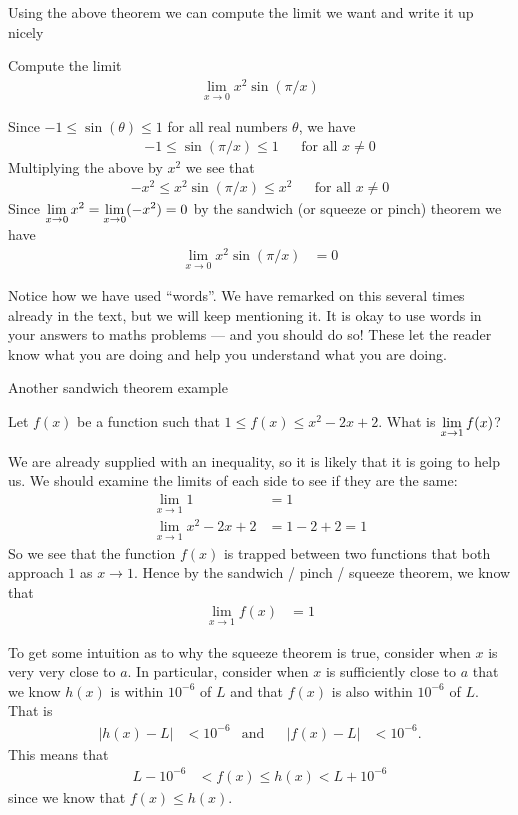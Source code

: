 Using the above theorem we can compute the limit we want and write it up nicely
\begin{eg}
  Compute the limit
\begin{align*}
  \lim_{x \to 0} x^2 \sin(\pi/x)
\end{align*}

  Since $-1 \leq \sin(\theta) \leq 1$ for all real numbers $\theta$, we have
\begin{align*}
  -1 \leq \sin(\pi /x ) \leq 1 && \text{for all $x \neq 0$}
\end{align*}
  Multiplying the above by $x^2$ we see that
\begin{align*}
  -x^2 \leq x^2 \sin(\pi /x ) \leq x^2 && \text{for all $x \neq 0$}
\end{align*}
  Since $\displaystyle \lim_{x \to 0} x^2 = \lim_{x \to 0} (-x^2) = 0$ by the sandwich
(or squeeze or pinch) theorem we have
\begin{align*}
  \lim_{x \to 0} x^2 \sin(\pi/x) &= 0
\end{align*}
\end{eg}
Notice how we have used ``words''. We have remarked on this several times
already in the text, but we will keep mentioning it. It is okay to use words in
your answers to maths problems --- and you should do so! These let the reader
know what you are  doing and help you understand what you are doing.

Another sandwich theorem example
\begin{eg}
Let $f(x)$ be a function such that $1 \leq f(x) \leq x^2-2x+2$. What is
$\displaystyle \lim_{x \to 1} f(x)$?

We are already supplied with an inequality, so it is likely that it is going to
help us. We should examine the limits of each side to see if they are the same:
\begin{align*}
  \lim_{x \to 1} 1 &= 1 \\
  \lim_{x \to 1} x^2-2x+2 &= 1-2+2 = 1
\end{align*}
So we see that the function $f(x)$ is trapped between two functions that both
approach $1$ as $x \to 1$. Hence by the sandwich / pinch / squeeze theorem, we
know that
\begin{align*}
  \lim_{x \to 1} f(x) & =1
\end{align*}
\end{eg}


To get some intuition as to why the squeeze theorem is true, consider when $x$ is very very close to $a$.
In particular, consider when $x$ is sufficiently close to $a$ that we know $h(x)$ is within $10^{-6}$ of $L$
and that $f(x)$ is also within $10^{-6}$ of $L$. That is
\begin{align*}
|h(x)-L| &<10^{-6}  & \text{and}&& |f(x)-L| &<10^{-6}.
\end{align*}
This means that
\begin{align*}
L-10^{-6} &< f(x) \leq h(x) < L+10^{-6}
\end{align*}
since we know that $f(x) \leq h(x)$.

